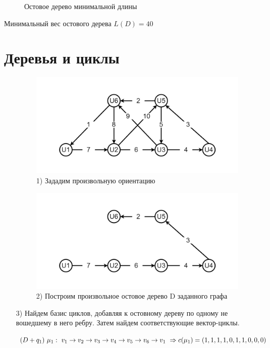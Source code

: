 \begin{figure}[H]
\begin{minipage}[h]{0.47\linewidth}
\end{minipage}
\caption{Остовое дерево минимальной длины}
\label{ris:experimentalcorrelationsignals}
\end{figure}
Минимальный вес остового дерева $L(D) = 40$
\newpage
\section{Деревья и циклы}
\begin{enumerate}
    \item[] \begin{figure}[!htb]
	\centering
	\includegraphics[width=\linewidth]{Images/graph11.jpg}
	\caption{1) Зададим произвольную ориентацию}
	\label{fig:image5}
	\end{figure}
    \item[] \begin{figure}[!htb]
	\centering
	\includegraphics[width=\linewidth]{Images/graph12.jpg}
	\caption{2) Построим произвольное остовое дерево D заданного графа}
	\label{fig:image6}
	\end{figure}
	\newpage
	\item[3)] Найдем базис циклов, добавляя к остовному дереву по одному не вошедшему в него ребру. Затем найдем соответствующие вектор-циклы.
	
	$(D+q_1) \ \mu_1:\ v_1 \to v_2 \to v_3 \to v_4 \to v_5 \to v_6 \to v_1 \ \Rightarrow \ \\ c(\mu_1) = (1,1,1,1,0,1,1,0,0,0)$
	

\end{enumerate}
